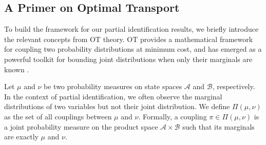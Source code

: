 \subsection{A Primer on Optimal Transport}\label{subsec:ot_primer}

To build the framework for our partial identification results, we briefly introduce the relevant concepts from OT theory. OT provides a mathematical framework for coupling two probability distributions at minimum cost, and has emerged as a powerful toolkit for bounding joint distributions when only their marginals are known \citep{galichon2016optimal}.

Let $\mu$ and $\nu$ be two probability measures on state spaces $\mathcal{A}$ and $\mathcal{B}$, respectively. In the context of partial identification, we often observe the marginal distributions of two variables but not their joint distribution. We define $\Pi(\mu, \nu)$ as the set of all couplings between $\mu$ and $\nu$. Formally, a coupling $\pi \in \Pi(\mu, \nu)$ is a joint probability measure on the product space $\mathcal{A} \times \mathcal{B}$ such that its marginals are exactly $\mu$ and $\nu$.

